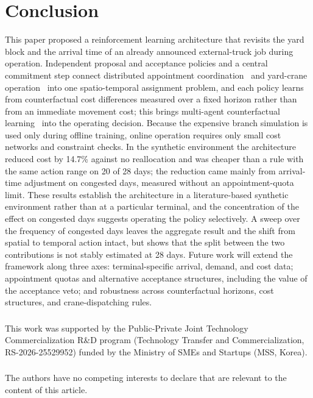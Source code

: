 \documentclass[a4paper]{llncs}
\begin{document}
\section{Conclusion}
\label{sec:concl}
This paper proposed a reinforcement learning architecture that revisits
the yard block and the arrival time of an already announced
external-truck job during operation. Independent proposal and acceptance
policies and a central commitment step connect distributed appointment
coordination~\cite{ref6} and yard-crane operation~\cite{ref7,ref8} into
one spatio-temporal assignment problem, and each policy learns from
counterfactual cost differences measured over a fixed horizon rather
than from an immediate movement cost; this brings multi-agent
counterfactual learning~\cite{ref10,ref11} into the operating decision.
Because the expensive branch simulation is used only during offline
training, online operation requires only small cost networks and
constraint checks. In the synthetic environment the architecture reduced
cost by 14.7\% against no reallocation and was cheaper than a rule with
the same action range on 20 of 28 days; the reduction came mainly from
arrival-time adjustment on congested days, measured without an
appointment-quota limit.
These results establish the architecture in a literature-based synthetic
environment rather than at a particular terminal, and the concentration
of the effect on congested days suggests operating the policy
selectively. A sweep over the frequency of congested
days leaves the aggregate result and the shift from spatial to temporal
action intact, but shows that the split between the two contributions is
not stably estimated at 28 days. Future work will extend the framework along three axes:
terminal-specific arrival, demand, and cost data; appointment quotas and
alternative acceptance structures, including the value of the acceptance
veto; and robustness across counterfactual horizons, cost structures, and
crane-dispatching rules.

\begin{credits}
\subsubsection{\ackname}
This work was supported by the Public-Private Joint Technology
Commercialization R\&D program (Technology Transfer and
Commercialization, RS-2026-25529952) funded by the Ministry of SMEs and
Startups (MSS, Korea).

\subsubsection{\discintname}
The authors have no competing interests to declare that are relevant to
the content of this article.
\end{credits}
\end{document}
